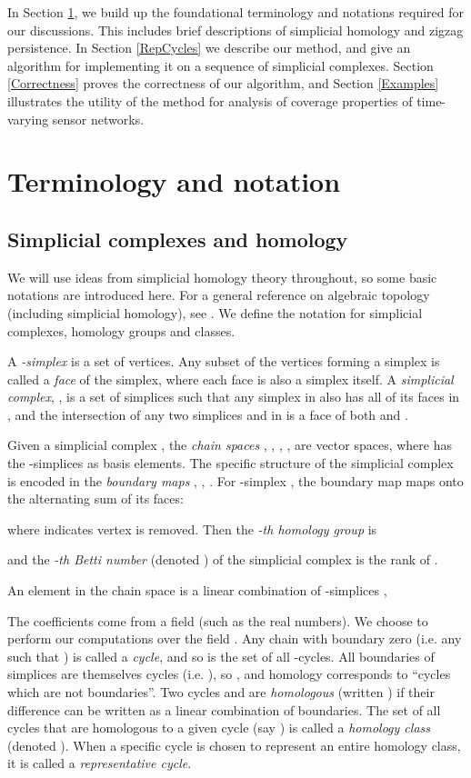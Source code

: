 \documentclass[12pt]{article}
\begin{document}
In Section \ref{Notation}, we build up the foundational terminology and notations required for our discussions. This includes brief descriptions of simplicial homology and zigzag persistence. In Section \ref{RepCycles} we describe our method, and give an algorithm for implementing it on a sequence of simplicial complexes. Section \ref{Correctness} proves the correctness of our algorithm, and Section \ref{Examples} illustrates the utility of the method for analysis of coverage properties of time-varying sensor networks.

\section{Terminology and notation}\label{Notation}

\subsection{Simplicial complexes and homology}

We will use ideas from simplicial homology theory throughout, so some basic notations are introduced here. For a general reference on algebraic topology (including simplicial homology), see \cite{hatcher2001}. We define the notation for simplicial complexes, homology groups and classes.

A \textit{-simplex}  is a set of  vertices. Any subset of the  vertices forming a simplex is called a \textit{face} of the simplex, where each face is also a simplex itself. A \textit{simplicial complex}, , is a set of simplices such that any simplex in  also has all of its faces in , and the intersection of any two simplices  and  in  is a face of both  and .

Given a simplicial complex , the \textit{chain spaces} , , , , are vector spaces, where  has the -simplices as basis elements. The specific structure of the simplicial complex is encoded in the \textit{boundary maps} , , . For -simplex , the boundary map  maps  onto the alternating sum of its faces:

where  indicates vertex  is removed. Then the \textit{-th homology group} is

and the \textit{-th Betti number} (denoted ) of the simplicial complex  is the rank of .

An element  in the chain space  is a linear combination of -simplices ,

The coefficients  come from a field  (such as the real numbers). We choose to perform our computations over the field . Any chain with boundary zero (i.e. any  such that ) is called a \textit{cycle}, and so  is the set of all -cycles. All boundaries of simplices are themselves cycles (i.e. ), so , and homology corresponds to ``cycles which are not boundaries''. Two cycles  and  are \textit{homologous} (written ) if their difference can be written as a linear combination of boundaries. The set of all cycles that are homologous to a given cycle (say ) is called a \textit{homology class} (denoted ). When a specific cycle is chosen to represent an entire homology class, it is called a \textit{representative cycle}.
\end{document}
